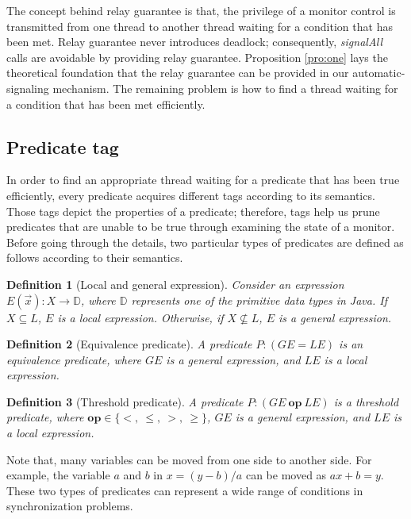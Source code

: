 \documentclass[preprint]{sigplanconf}
\newtheorem{definition}{Definition}
\begin{document}
The concept behind relay guarantee is that, the privilege of a monitor control
is transmitted from one thread to another thread waiting for a condition that 
has been met.
Relay guarantee never introduces deadlock; consequently, {\it signalAll} calls
are avoidable by providing relay guarantee. 
Proposition \ref{pro:one} lays the theoretical foundation that the relay
guarantee can be provided in our automatic-signaling mechanism. 
The remaining problem is how to find a thread waiting for a condition that has 
been met efficiently. 

\subsection{Predicate tag} 
In order to find an appropriate thread waiting for a predicate that has been
true efficiently, every predicate acquires different tags according to its 
semantics. Those tags depict the properties of a predicate; therefore, tags
help us prune predicates that are unable to be true through examining the state 
of a monitor. Before going through the details, two particular types of 
predicates are defined as follows according to their semantics. 
\begin{definition}[Local and general expression]
    Consider an expression $E(\vec{x}): X \rightarrow \mathbb{D}$, where
    $\mathbb{D}$ represents one of the primitive data types in Java. If $X
    \subseteq L$, $E$ is a local expression. Otherwise, if $X \not\subseteq L$,
    $E$ is a general expression.  
\end{definition}

\begin{definition}[Equivalence predicate]
    A predicate $P: (GE = LE)$ is an equivalence predicate, where $GE$ is a
    general expression, and $LE$ is a local expression.
\end{definition}
\begin{definition}[Threshold predicate]
   A predicate $P: (GE\ \boldsymbol{op}\ LE)$ is a threshold predicate, where 
   $\boldsymbol{op}
    \in \{<,\ \le,\ >,\ \ge\}$, $GE$ is a general expression, and $LE$ is a
    local expression.
\end{definition}
Note that, many variables can be moved from one side to another side. For
example, the variable $a$ and $b$ in $x = (y - b) / a$ can be moved as 
$ax + b = y$. These two types of predicates can represent a wide range of
conditions in synchronization problems. 
\end{document}
